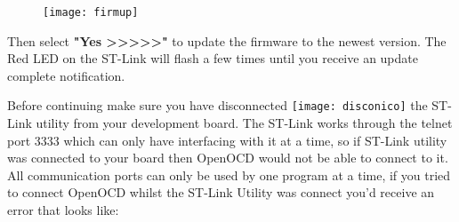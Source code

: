 \begin{figure}[htbp]
\centering
\texttt{[image: firmup]}
\end{figure}
\par
Then select \textbf{\color{Purple} "Yes >>>>>"} to update the firmware to the newest version. The Red LED on the ST-Link will flash a few times until you receive an update complete notification. 
\\
\par
\raggedright
Before continuing make sure you have disconnected \texttt{[image: disconico]} the ST-Link utility from your development board.  The ST-Link works through the telnet port 3333 which can only have \underline{} interfacing with it at a time, so if ST-Link utility was connected to your board then OpenOCD would not be able to connect to it. All communication ports can only be used by one program at a time, if you tried to connect OpenOCD whilst the ST-Link Utility was connect you'd receive an error that looks like:
\\
\centering
